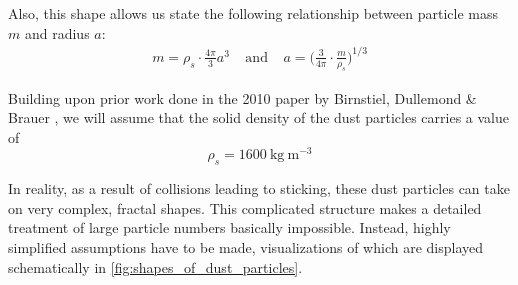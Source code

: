         Also, this shape allows us state the following relationship between 
        particle mass $m$ and radius $a$:
        \begin{align}
            m
                =\rho_s \cdot \frac{4\pi}{3}a^3
            \ \ \ \ \ \text{and}\ \ \ \ \
            a
                =\bigg(\frac{3}{4\pi} \cdot \frac{m}{\rho_s}\bigg)^{1/3}
        \end{align}

        Building upon prior work done in the 2010 paper by Birnstiel, Dullemond \& Brauer 
        \cite{birnstiel_dullemond_brauer_2010}, we will assume that the solid density of the dust 
        particles carries a value of
        \begin{equation}
            \rho_s = \SI{1600}{\kilogram~\meter^{-3}}
        \end{equation}

        In reality, as a result of collisions leading to sticking, these dust particles can 
        take on very complex, fractal shapes.
        This complicated structure makes a detailed treatment of large particle numbers 
        basically impossible. Instead, highly simplified assumptions have to be made,
        visualizations of which are displayed schematically in 
        \cref{fig:shapes_of_dust_particles}.


        \vfill

